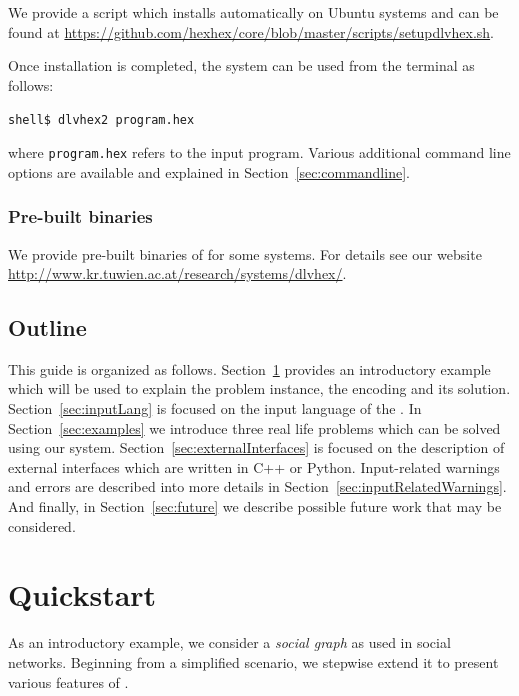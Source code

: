 \documentclass[a4paper, titlepage]{article}
\begin{document}
We provide a script which installs \dlvhex{} 
automatically on Ubuntu systems and can be found at 
\url{https://github.com/hexhex/core/blob/master/scripts/setupdlvhex.sh}.

Once installation is completed, the system can be used from 
the terminal as follows:\\ 
\centerline{\texttt{shell\$ dlvhex2 program.hex}} where 
\texttt{program.hex} refers to the input program. Various 
additional command line options are available and explained in Section~\ref{sec:commandline}.    

\subsubsection{Pre-built binaries}
We provide pre-built binaries of \dlvhex{} for some 
systems. For details see our website 
\url{http://www.kr.tuwien.ac.at/research/systems/dlvhex/}. 

\subsection{Outline}
This guide is organized as follows. Section~\ref{sec:quick} 
provides an introductory example which will be used to 
explain the problem instance, the encoding and its 
solution. Section~\ref{sec:inputLang} is focused on the input 
language of the \dlvhex{}. In Section~\ref{sec:examples} we 
introduce three real life problems which can be solved 
using our system. Section~\ref{sec:externalInterfaces} is 
focused on the description of external interfaces which are 
written in C++ or Python. Input-related warnings and errors 
are described into more details in 
Section~\ref{sec:inputRelatedWarnings}. And finally, in 
Section~\ref{sec:future} we describe possible future work 
that may be considered.

\section{Quickstart} %
\label{sec:quick}
As an introductory example, we consider a \emph{social 
graph} as used in social networks. Beginning from a 
simplified scenario, we stepwise extend it to present 
various features of \dlvhex{}.
\end{document}
